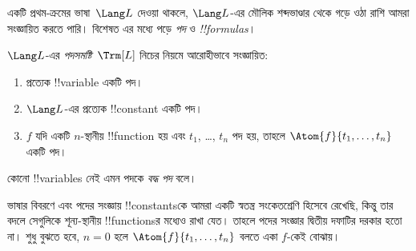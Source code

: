 \documentclass[../../../include/open-logic-section]{subfiles}
\begin{document}


একটি প্রথম-ক্রমের ভাষা~$\Lang L$ দেওয়া থাকলে, $\Lang L$-এর মৌলিক
শব্দভাণ্ডার থেকে গড়ে ওঠা রাশি আমরা সংজ্ঞায়িত করতে পারি। বিশেষত এর
মধ্যে পড়ে \emph{পদ} ও \emph{!!{formula}s}।

\begin{defn}[পদ]
$\Lang L$-এর \emph{পদসমষ্টি}~$\Trm[L]$ নিচের নিয়মে আরোহীভাবে
সংজ্ঞায়িত:
\begin{enumerate}
\item প্রত্যেক !!{variable} একটি পদ।
\item $\Lang L$-এর প্রত্যেক !!{constant} একটি পদ।
\item $f$ যদি একটি $n$-স্থানীয় !!{function} হয় এবং $t_1$, \dots,
  $t_n$ পদ হয়, তাহলে $\Atom{f}{t_1, \ldots, t_n}$ একটি পদ।
\end{enumerate}
কোনো !!{variable}s নেই এমন পদকে \emph{বদ্ধ পদ} বলে।
\end{defn}

\begin{explain}
ভাষার বিবরণে এবং পদের সংজ্ঞায় !!{constant}sকে আমরা একটি স্বতন্ত্র
সংকেতশ্রেণি হিসেবে রেখেছি, কিন্তু তার বদলে সেগুলিকে শূন্য-স্থানীয়
!!{function}sর মধ্যেও রাখা যেত। তাহলে পদের সংজ্ঞার দ্বিতীয় দফাটির
দরকার হতো না। শুধু বুঝতে হবে, $n = 0$ হলে
$\Atom{f}{t_1, \ldots, t_n}$ বলতে একা $f$-কেই বোঝায়।
\end{explain}
\end{document}
